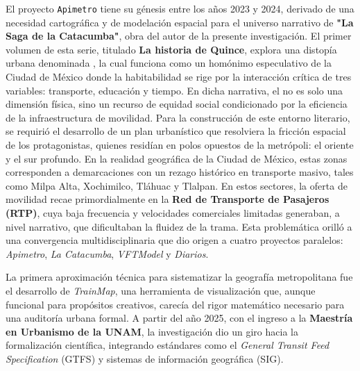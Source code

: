 El proyecto \texttt{Apimetro} tiene su génesis entre los años 2023 y 2024, derivado de una necesidad cartográfica y de modelación espacial para el universo narrativo de \textbf{"La Saga de la Catacumba"}, obra del autor de la presente investigación. 
El primer volumen de esta serie, titulado \textbf{La historia de Quince}, explora una distopía urbana denominada \DIFdelbegin {}\DIFdelend \DIFaddbegin {}\DIFaddend , la cual funciona como un homónimo especulativo de la Ciudad de México donde la habitabilidad se rige por la interacción crítica 
de tres variables: transporte, educación y tiempo. En dicha narrativa, el \DIFdelbegin {}\DIFdelend \DIFaddbegin {}\DIFaddend no es solo una dimensión física, sino un recurso de equidad social condicionado por la eficiencia de la infraestructura de movilidad. Para la construcción de este entorno literario, 
se requirió el desarrollo de un plan urbanístico que resolviera la fricción espacial de los protagonistas, quienes residían en polos opuestos de la metrópoli: el oriente y el sur profundo. En la realidad geográfica de la Ciudad de México, estas zonas corresponden a 
demarcaciones con un rezago histórico en transporte masivo, tales como Milpa Alta, Xochimilco, Tláhuac y Tlalpan. En estos sectores, la oferta de movilidad recae primordialmente en la \textbf{Red de Transporte de Pasajeros (RTP)}, 
cuya baja frecuencia y velocidades comerciales limitadas generaban, a nivel narrativo, \DIFdelbegin {}\DIFdelend \DIFaddbegin {}\DIFaddend que dificultaban la fluidez de la trama. Esta problemática orilló a una convergencia multidisciplinaria que dio origen a cuatro proyectos paralelos: 
\textit{Apimetro}, \textit{La Catacumba}, \textit{VFTModel} y \textit{Diarios}.

La primera aproximación técnica para sistematizar la geografía metropolitana fue el desarrollo de \textit{\DIFdelbegin {}\DIFdelend \DIFaddbegin {}\DIFaddend TrainMap\DIFdelbegin {}\DIFdelend \DIFaddbegin {}\DIFaddend }, una herramienta de visualización que, aunque funcional 
para propósitos creativos, carecía del rigor matemático necesario para una auditoría urbana formal. A partir del año 2025, con el ingreso a la \textbf{Maestría en Urbanismo de la UNAM}, la investigación dio un giro hacia la formalización científica, 
integrando estándares como el \textit{General Transit Feed Specification} (GTFS) y sistemas de información geográfica (SIG).

